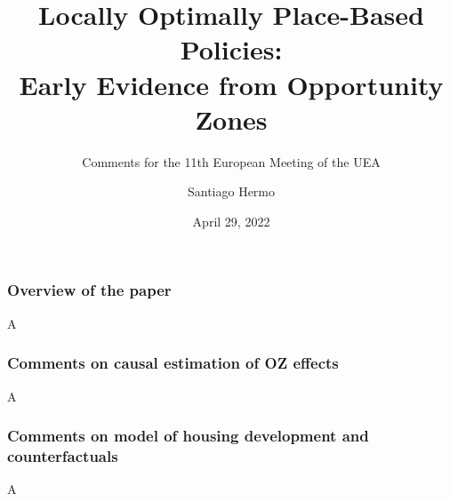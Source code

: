 \documentclass[aspectratio=169, t]{beamer}
\title{Locally Optimally Place-Based Policies: \\ 
       Early Evidence from Opportunity Zones}
\subtitle{\vspace{3mm} Comments for the 11th European Meeting of the UEA}
\date{April 29, 2022}
\author{Santiago Hermo\vspace{-3mm} }
\institute{Brown University}
\begin{document}
\maketitle



\begin{frame}
    \frametitle{Overview of the paper}
    
    A

\end{frame}

\begin{frame}
    \frametitle{Comments on causal estimation of OZ effects}
    
    A

\end{frame}

\begin{frame}
    \frametitle{Comments on model of housing development and counterfactuals}
    
    A

\end{frame}
\end{document}
